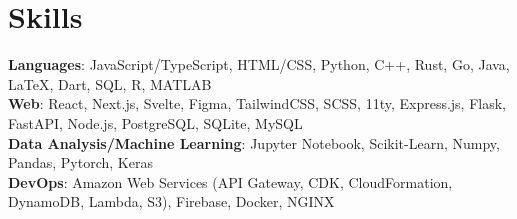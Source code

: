 \documentclass{article}
\newcommand{\resumesection}[3]{
    \subsection*{#1}
    \ 
    \normalsize
    \normalsize
    \hfill
    \textcolor{black}{#3}
    \normalsize
    \newline
    \small
    \textcolor{grey}{\emph{#2}}
}
\begin{document}
\section*{Skills}
\textbf{Languages}: JavaScript/TypeScript, HTML/CSS, Python, C++, Rust, Go, Java, {\selectfont\LaTeX}, Dart, SQL, R, MATLAB\\
\textbf{Web}: React, Next.js, Svelte, Figma, TailwindCSS, SCSS, 11ty, Express.js, Flask, FastAPI, Node.js, PostgreSQL, SQLite, MySQL\\
\textbf{Data Analysis/Machine Learning}: Jupyter Notebook, Scikit-Learn, Numpy, Pandas, Pytorch, Keras\\
\textbf{DevOps}: Amazon Web Services (API Gateway, CDK, CloudFormation, DynamoDB, Lambda, S3), Firebase, Docker, NGINX\\
\end{document}
